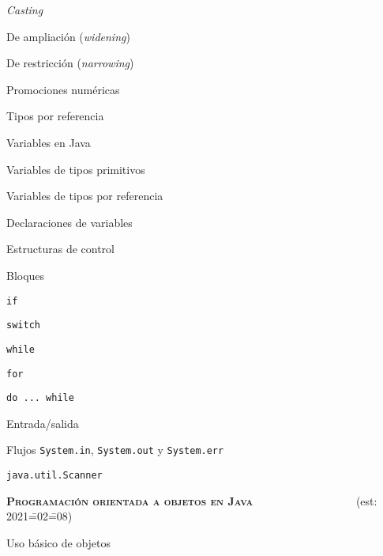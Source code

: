 \begin{longenum}
\begin{longenum}
\begin{longenum}
\begin{longenum}
\begin{longenum}
                    \item \textit{Casting}
                    \item De ampliación (\textit{widening})
                    \item De restricción (\textit{narrowing})
                \end{longenum}
                \item Promociones numéricas
            \end{longenum}
            \item Tipos por referencia
        \end{longenum}
        \item Variables en Java
        \begin{longenum}
            \item Variables de tipos primitivos
            \item Variables de tipos por referencia
            \item Declaraciones de variables
        \end{longenum}
        \item Estructuras de control
        \begin{longenum}
            \item Bloques
            \item \texttt{if}
            \item \texttt{switch}
            \item \texttt{while}
            \item \texttt{for}
            \item \texttt{do ... while}
        \end{longenum}
        \item Entrada/salida
        \begin{longenum}
            \item Flujos \texttt{System.in}, \texttt{System.out} y \texttt{System.err}
            \item \texttt{java.util.Scanner}
        \end{longenum}
    \end{longenum}
    \item \textbf{\textsc{Programación orientada a objetos en Java}} \ \ \ \ \ \ \ \ \ \ \ \ \ \ \ \ \ \ (est: 2021\==02\==08)
    \begin{longenum}
        \item Uso básico de objetos

\end{longenum}
\end{longenum}
